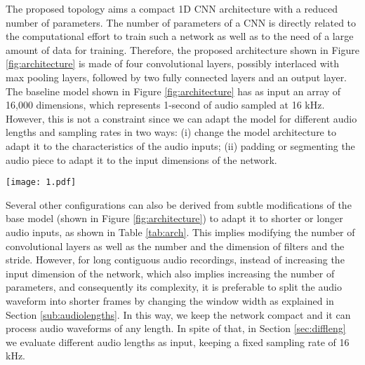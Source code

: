 \documentclass[preprint,final,12pt]{elsarticle}
\begin{document}
The proposed topology aims a compact 1D CNN architecture with a reduced number of parameters. The number of parameters of a CNN is directly related to the computational effort to train such a network as well as to the need of a large amount of data for training. Therefore, the proposed architecture shown in Figure \ref{fig:architecture} is made of four convolutional layers, possibly interlaced with max pooling layers, followed by two fully connected layers and an output layer. The baseline model shown in Figure \ref{fig:architecture} has as input an array of 16,000 dimensions, which represents 1-second of audio sampled at 16 kHz. However, this is not a constraint since we can adapt the model for different audio lengths and sampling rates in two ways: (i) change the model architecture to adapt it to the characteristics of the audio inputs; (ii) padding or segmenting the audio piece to adapt it to the input dimensions of the network.

\begin{figure*}[htpb!]
  \centering
  \texttt{[image: 1.pdf]}
  \caption{The architecture of the proposed end-to-end 1D CNN for environmental sound classification. The dimension, number of filters and filter size are given for the input size of 16,000. For other input sizes, the values are presented in Table \ref{tab:arch}.}
  \label{fig:architecture}
\end{figure*}


Several other configurations can also be derived from subtle modifications of the base model (shown in Figure \ref{fig:architecture}) to adapt it to shorter or longer audio inputs, as shown in Table \ref{tab:arch}. This implies modifying the number of convolutional layers as well as the number and the dimension of filters and the stride. However, for long contiguous audio recordings, instead of increasing the input dimension of the network, which also implies increasing the number of parameters, and consequently its complexity, it is preferable to split the audio waveform into shorter frames by changing the window width as explained in Section \ref{sub:audiolengths}. In this way, we keep the network compact and it can process audio waveforms of any length. In spite of that, in Section \ref{sec:diffleng} we evaluate different audio lengths as input, keeping a fixed sampling rate of 16 kHz.
\end{document}
